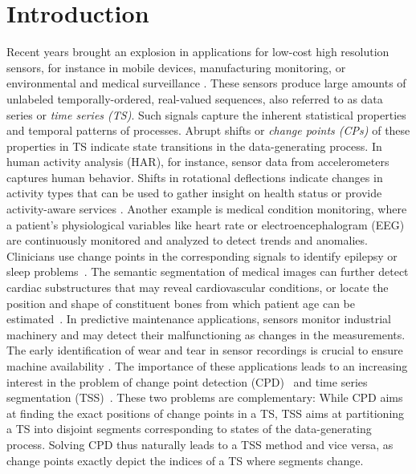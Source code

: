 \documentclass[pdflatex,sn-basic]{sn-jnl}
\begin{document}
\section{Introduction}

Recent years brought an explosion in applications for low-cost high resolution sensors, for instance in mobile devices, manufacturing monitoring, or environmental and medical surveillance \citep{Carvalho2019ASL}. These sensors produce large amounts of unlabeled temporally-ordered, real-valued sequences, also referred to as data series or \emph{time series (TS)}. Such signals capture the inherent statistical properties and temporal patterns of processes. Abrupt shifts or \emph{change points (CPs)} of these properties in TS indicate state transitions in the data-generating process. In human activity analysis (HAR), for instance, sensor data from accelerometers captures human behavior. Shifts in rotational deflections indicate changes in activity types that can be used to gather insight on health status or provide activity-aware services \citep{Feuz2015AutomatedDO}. Another example is medical condition monitoring, where a patient's physiological variables like heart rate or electroencephalogram (EEG) are continuously monitored and analyzed to detect trends and anomalies. Clinicians use change points in the corresponding signals to identify epilepsy or sleep problems~\citep{Malladi2013OnlineBC}. The semantic segmentation of medical images can further detect cardiac substructures that may reveal cardiovascular conditions, or locate the position and shape of constituent bones from which patient age can be estimated~\citep{Janik2021InterpretabilityOA,Davis2012OnTS}. In predictive maintenance applications, sensors monitor industrial machinery and may detect their malfunctioning as changes in the measurements. The early identification of wear and tear in sensor recordings is crucial to ensure machine availability \citep{Zenisek2019MachineLB}. The importance of these applications leads to an increasing interest in the problem of change point detection (CPD)~\citep{truong2020selective} and time series segmentation (TSS)~\citep{aminikhanghahi2017survey}. These two problems are complementary: While CPD aims at finding the exact positions of change points in a TS, TSS aims at partitioning a TS into disjoint segments corresponding to states of the data-generating process. Solving CPD thus naturally leads to a TSS method and vice versa, as change points exactly depict the indices of a TS where segments change. 
\end{document}
